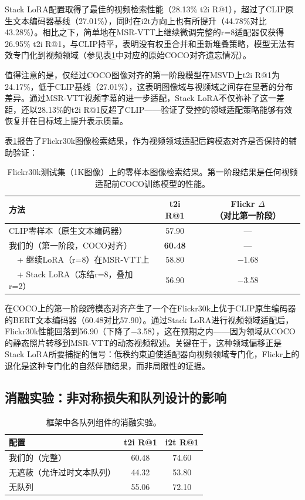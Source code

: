 \documentclass[10pt,a4paper]{ctexart}
\begin{document}
Stack LoRA配置取得了最佳的视频检索性能（28.13\% t2i R@1），超过了CLIP原生文本编码器基线（27.01\%），同时在i2t方向上也有所提升（44.78\%对比43.28\%）。相比之下，简单地在MSR-VTT上继续微调完整的r=8适配器仅获得26.95\% t2i R@1，与CLIP持平，表明没有权重合并和重新堆叠策略，模型无法有效专门化到视频领域（参见表\ref{tab:flickr_results}中对应的原始COCO对齐遗忘情况）。

值得注意的是，仅经过COCO图像对齐的第一阶段模型在MSVD上t2i R@1为24.17\%，低于CLIP基线（27.01\%），这表明图像域与视频域之间存在显著的分布差异。通过MSR-VTT视频字幕的进一步适配，Stack LoRA不仅弥补了这一差距，还以28.13\%的t2i R@1反超了CLIP——验证了受控的领域适配策略能够有效恢复并在目标域上提升表示质量。

表\ref{tab:flickr_results}报告了Flickr30k图像检索结果，作为视频领域适配后跨模态对齐是否保持的辅助验证：

\begin{table}[h]
\centering
\caption{Flickr30k测试集（1K图像）上的零样本图像检索结果。第一阶段结果是任何视频适配前COCO训练模型的性能。}
\label{tab:flickr_results}
\begin{tabular}{lcc}
\toprule
方法 & t2i R@1 & Flickr $\Delta$（对比第一阶段） \\
\midrule
CLIP零样本（原生文本编码器） & 57.90 & --- \\
我们的（第一阶段，COCO对齐） & \textbf{60.48} & --- \\
~~+ 继续LoRA（r=8）在MSR-VTT上 & 58.80 & $-$1.68 \\
~~+ Stack LoRA（冻结r=8，叠加r=2） & 56.90 & $-$3.58 \\
\bottomrule
\end{tabular}
\end{table}

在COCO上的第一阶段跨模态对齐产生了一个在Flickr30k上优于CLIP原生编码器的BERT文本编码器（60.48对比57.90）。通过Stack LoRA进行视频领域适配后，Flickr30k性能回落到56.90（下降了$-$3.58），这在预期之内——因为领域从COCO的静态照片转移到MSR-VTT的动态视频叙述。关键在于，这种领域偏移正是Stack LoRA所要捕捉的信号：低秩约束迫使适配器向视频领域专门化，Flickr上的退化是这种专门化的自然伴随结果，而非局限性的证据。

\subsection{消融实验：非对称损失和队列设计的影响}

\begin{table}[h]
\centering
\begin{tabular}{lcc}
\toprule
配置 & t2i R@1 & i2t R@1 \\
\midrule
我们的（完整） & 60.48 & 74.60 \\
无遮蔽（允许过时文本队列） & 44.32 & 53.80 \\
无队列 & 55.06 & 72.10 \\
\bottomrule
\end{tabular}
\caption{框架中各队列组件的消融实验。}
\label{tab:ablation}
\end{table}
\end{document}
